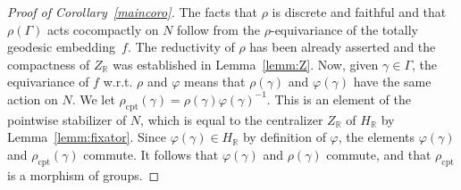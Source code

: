 \documentclass[10pt]{amsart}
\theoremstyle{plain}
\theoremstyle{definition}
\newcommand{\bR}{\mathbb{R}}
\newcommand{\rhoc}{\rho_\mathrm{cpt}}
\begin{document}
\begin{proof}[Proof of Corollary~\ref{maincoro}]
The facts that $\rho$ is discrete and
faithful and that $\rho(\Gamma)$ acts cocompactly on $N$ follow from the $\rho$-equivariance of the totally geodesic
embedding~$f$. The reductivity of $\rho$ has been already asserted and the compactness of $Z_\bR$
was established in Lemma~\ref{lemm:Z}.
Now, given $\gamma \in \Gamma$, the equivariance of $f$ w.r.t. $\rho$ and $\varphi$ means that
$\rho(\gamma)$ and $\varphi(\gamma)$ have the same action on $N$.
We let $\rhoc(\gamma)=\rho(\gamma)\varphi(\gamma)^{-1}$. This is an element of the pointwise stabilizer of $N$,
which is equal to the centralizer $Z_\bR$ of $H_\bR$ by Lemma~\ref{lemm:fixator}. Since
$\varphi(\gamma) \in H_\bR$ by definition of $\varphi$, the elements $\varphi(\gamma)$ and
$\rhoc(\gamma)$ commute.
It follows that $\varphi(\gamma)$ and $\rho(\gamma)$ commute, and that $\rhoc$ is a morphism of groups.
\end{proof}
\end{document}
